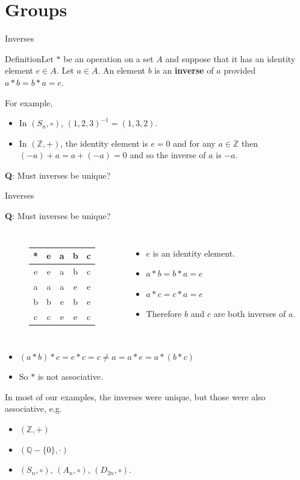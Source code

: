 \documentclass{beamer}
\def\bl[#1]#2{\begin{block}{#1}#2\end{block}}
\def\itemb{\begin{itemize}}
\def\iteme{\end{itemize}}
\begin{document}
\section{Groups}

\begin{frame}{Inverses}
\bl[Definition]{Let $*$ be an operation on a set $A$ and suppose that it has an identity element $e\in A$. Let $a\in A$. An element $b$ is an \textbf{inverse} of $a$ provided $a*b=b*a=e$.}
For example,
\begin{itemize}
\item In $(S_n,\circ)$, $(1,2,3)^{-1}=(1,3,2)$.
\item In $(\mathbb{Z},+)$, the identity element is $e=0$ and for any $a\in\mathbb{Z}$ then $(-a)+a=a+(-a)=0$ and so the inverse of $a$ is $-a$.
\end{itemize}
\textbf{Q}: Must inverses be unique?
\end{frame}

\begin{frame}{Inverses}
\bl[]{\textbf{Q}: Must inverses be unique?}
\begin{columns}
\begin{figure}
\centering
\begin{tabular}{|c|cccc|}
\hline
*&e&a&b&c\\
\hline
e&e&a&b&c\\
a&a&a&e&e\\
b&b&e&b&e\\
c&c&e&e&c\\
\hline
\end{tabular}
\end{figure}
\itemb
\item $e$ is an identity element.
\item $a*b=b*a=e$
\item $a*c=c*a=e$
\item Therefore $b$ and $c$ are both inverses of $a$.
\iteme
\end{columns}\vspace{0.3cm}
\itemb 
\item $(a*b)*c=e*c=c\neq a= a*e=a*(b*c)$
\item So $*$ is not associative.
\iteme


In most of our examples, the inverses were unique, but those were also associative, e.g.
\itemb
\item $(\mathbb{Z},+)$
\item $(\mathbb{Q}-\{0\},\cdot)$
\item $(S_n,\circ)$, $(A_n,\circ)$, $(D_{2n},\circ)$.
\iteme
\end{frame}
\end{document}
